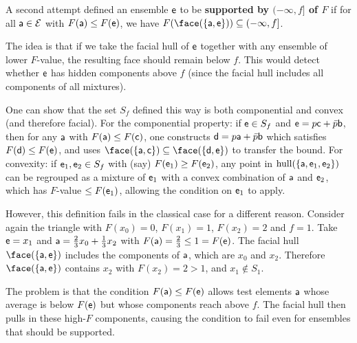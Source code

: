 	\begin{remark}
		A second attempt defined an ensemble $\ens$ to be \textbf{supported by $(-\infty, f]$ of $F$} if for all $\ens[a] \in \Ens$ with $F(\ens[a]) \leq F(\ens)$, we have $F(\face(\{\ens[a], \ens\})) \subseteq (-\infty, f]$.
		
		The idea is that if we take the facial hull of $\ens$ together with any ensemble of lower $F$-value, the resulting face should remain below $f$. This would detect whether $\ens$ has hidden components above $f$ (since the facial hull includes all components of all mixtures).
		
		One can show that the set $S_f$ defined this way is both componential and convex (and therefore facial). For the componential property: if $\ens \in S_f$ and $\ens = p\ens[c] + \bar{p}\ens[b]$, then for any $\ens[a]$ with $F(\ens[a]) \leq F(\ens[c])$, one constructs $\ens[d] = p\ens[a] + \bar{p}\ens[b]$ which satisfies $F(\ens[d]) \leq F(\ens)$, and uses $\face(\{\ens[a], \ens[c]\}) \subseteq \face(\{\ens[d], \ens\})$ to transfer the bound. For convexity: if $\ens_1, \ens_2 \in S_f$ with (say) $F(\ens_1) \geq F(\ens_2)$, any point in $\hull(\{\ens[a], \ens_1, \ens_2\})$ can be regrouped as a mixture of $\ens_1$ with a convex combination of $\ens[a]$ and $\ens_2$, which has $F$-value $\leq F(\ens_1)$, allowing the condition on $\ens_1$ to apply.
		
		However, this definition fails in the classical case for a different reason. Consider again the triangle with $F(x_0) = 0$, $F(x_1) = 1$, $F(x_2) = 2$ and $f = 1$. Take $\ens = x_1$ and $\ens[a] = \frac{2}{3}x_0 + \frac{1}{3}x_2$ with $F(\ens[a]) = \frac{2}{3} \leq 1 = F(\ens)$. The facial hull $\face(\{\ens[a], \ens\})$ includes the components of $\ens[a]$, which are $x_0$ and $x_2$. Therefore $\face(\{\ens[a], \ens\})$ contains $x_2$ with $F(x_2) = 2 > 1$, and $x_1 \notin S_1$.
		
		The problem is that the condition $F(\ens[a]) \leq F(\ens)$ allows test elements $\ens[a]$ whose average is below $F(\ens)$ but whose components reach above $f$. The facial hull then pulls in these high-$F$ components, causing the condition to fail even for ensembles that should be supported.
	\end{remark}


